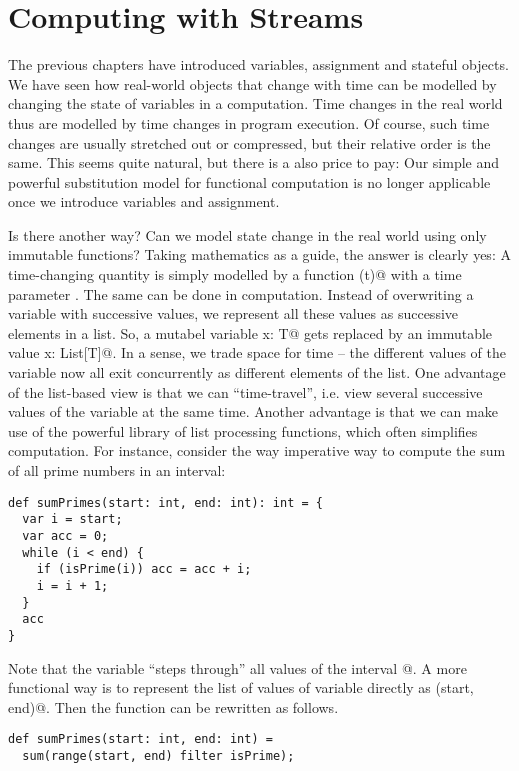 \documentclass[11pt]{book}
\begin{document}
\chapter{Computing with Streams}

The previous chapters have introduced variables, assignment and
stateful objects.  We have seen how real-world objects that change
with time can be modelled by changing the state of variables in a
computation.  Time changes in the real world thus are modelled by time
changes in program execution. Of course, such time changes are usually
stretched out or compressed, but their relative order is the same.
This seems quite natural, but there is a also price to pay: Our simple
and powerful substitution model for functional computation is no
longer applicable once we introduce variables and assignment.

Is there another way? Can we model state change in the real world
using only immutable functions? Taking mathematics as a guide, the
answer is clearly yes: A time-changing quantity is simply modelled by
a function \verb@f(t)@ with a time parameter \verb@t@. The same can be
done in computation. Instead of overwriting a variable with successive
values, we represent all these values as successive elements in a
list. So, a mutabel variable \verb@var x: T@ gets replaced by an
immutable value \verb@val x: List[T]@. In a sense, we trade space for
time -- the different values of the variable now all exit concurrently
as different elements of the list.  One advantage of the list-based
view is that we can ``time-travel'', i.e. view several successive
values of the variable at the same time. Another advantage is that we
can make use of the powerful library of list processing functions,
which often simplifies computation. For instance, consider the way
imperative way to compute the sum of all prime numbers in an interval:
\begin{verbatim}
def sumPrimes(start: int, end: int): int = {
  var i = start;
  var acc = 0;
  while (i < end) {
    if (isPrime(i)) acc = acc + i;
    i = i + 1;
  }
  acc
}
\end{verbatim}
Note that the variable \verb@i@ ``steps through'' all values of the interval
@.
A more functional way is to represent the list of values of variable \verb@i@ directly as \verb@range(start, end)@. Then the function can be rewritten as follows.
\begin{verbatim}
def sumPrimes(start: int, end: int) =
  sum(range(start, end) filter isPrime);
\end{verbatim}
\end{document}
